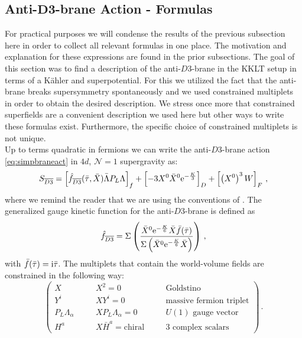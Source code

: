 \documentclass[a4paper,12pt,twoside,openright]{report}
\newcommand{\be}{\begin{equation}}
\newcommand{\ee}{\end{equation}}
\def\rmi{{\rm i}}
\def\rme{{\rm e}}
\begin{document}
\subsection[Anti-$D3$-brane Action - Formulas]{Anti-$\mathbf{D3}$-brane Action - Formulas}
For practical purposes we will condense the results of the previous subsection here in order to collect all relevant formulas in one place. The motivation and explanation for these expressions are found in the prior subsections. The goal of this section was to find a description of the anti-$D3$-brane in the KKLT setup in terms of a Kähler and superpotential. For this we utilized the fact that the anti-brane breaks supersymmetry spontaneously and we used constrained multiplets in order to obtain the desired description. We stress once more that constrained superfields are a convenient description we used here but other ways to write these formulas exist. Furthermore, the specific choice of constrained multiplets is not unique.\\
Up to terms quadratic in fermions we can write the anti-$D3$-brane action \eqref{eq:simpbraneact} in $4d$, $\mathcal{N}=1$ supergravity as:
\be 
S_{\overline{D3}}=\left[\hat{f}_{\overline{D3}}(\bar{\tau},\bar{X}) \bar{\Lambda}P_L\Lambda\right]_f + \left[-3X^0 \bar{X}^0\rme^{-\frac{K}{3}}\right]_D + \left[\left(X^0\right)^3 W\right]_F\,,
\label{eq:D3barfinalact}
\ee
where we remind the reader that we are using the conventions of \cite{Freedman:2012zz}. The generalized gauge kinetic function for the anti-$D3$-brane is defined as
\be 
\hat{f}_{\overline{D3}} = \Sigma\left( \frac{\bar{X}^0 \rme^{-\frac{K}{6}}\bar{X}\bar{f}(\bar{\tau})}{\Sigma \left( \bar{X}^0 \rme^{-\frac{K}{6}}\bar{X}\right)}\right)\,,
\ee
with $\bar{f}(\bar{\tau}) = \rmi \bar{\tau}$. The multiplets that contain the world-volume fields are constrained in the following way:
\be
\begin{pmatrix}
X & \quad & X^2=0 & \quad & \text{Goldstino}\\
Y^i & & X Y^i = 0& & \text{massive fermion triplet}\\
P_L \Lambda_\alpha & & X P_L \Lambda_\alpha = 0 & & U(1) \text{ gauge vector}\\
H^a & & X\bar{H}^a = \text{chiral} & & \text{3 complex scalars}
\end{pmatrix}\,.
\label{eq:D3barmultfinal}
\ee
\end{document}
